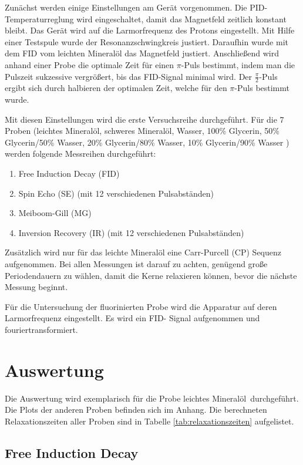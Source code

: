 \documentclass[10pt,twoside]{article}
\renewcommand{\1}{^{-1}}
\renewcommand{\2}{^{-2}}
\newcommand{\3}{^{-3}}
\newcommand{\4}{^{-4}}
\newcommand{\5}{^{-5}}
\newcommand{\6}{^{-6}}
\newcommand{\7}{^{-7}}
\newcommand{\8}{^{-8}}
\newcommand{\9}{^{-9}}
\begin{document}
Zunächst werden einige Einstellungen am Gerät vorgenommen.
Die PID-Temperaturreglung wird eingeschaltet, damit das Magnetfeld zeitlich konstant bleibt. 
Das Gerät wird auf die Larmorfrequenz des Protons eingestellt.
Mit Hilfe einer Testspule wurde der Resonanzschwingkreis justiert.
Daraufhin wurde mit dem FID vom leichten Mineralöl das Magnetfeld justiert.
Anschließend wird anhand einer Probe die optimale Zeit für einen $\pi$-Puls bestimmt, 
indem man die Pulszeit sukzessive vergrößert, bis das FID-Signal minimal wird.
Der $\frac{\pi}{2}$-Puls ergibt sich durch halbieren der optimalen Zeit, welche für den $\pi$-Puls bestimmt wurde.

Mit diesen Einstellungen wird die erste Versuchsreihe durchgeführt.
Für die 7 Proben (leichtes Mineralöl, schweres Mineralöl, Wasser, 100\% Glycerin, 50\% Glycerin/50\% Wasser, 20\% Glycerin/80\% Wasser, 10\% Glycerin/90\% Wasser )
werden folgende Messreihen durchgeführt:
\begin{enumerate}[itemsep=0pt] 
\item Free Induction Decay (FID)
\item Spin Echo (SE) (mit 12 verschiedenen Pulsabständen)
\item Meiboom-Gill (MG) 
\item Inversion Recovery (IR) (mit 12 verschiedenen Pulsabständen)
\end{enumerate}

Zusätzlich wird nur für das leichte Mineralöl eine Carr-Purcell (CP) Sequenz aufgenommen.
Bei allen Messungen ist darauf zu achten, genügend große Periodendauern zu wählen, damit die Kerne relaxieren können, bevor die nächste Messung beginnt.

Für die Untersuchung der fluorinierten Probe wird die Apparatur auf deren Larmorfrequenz eingestellt. 
Es wird ein FID- Signal aufgenommen und fouriertransformiert.

\section{Auswertung}

Die Auswertung wird exemplarisch für die Probe \glqq leichtes Mineralöl\grqq~durchgeführt. Die Plots der anderen Proben befinden sich im Anhang. Die berechneten Relaxationszeiten aller Proben sind in Tabelle \ref{tab:relaxationszeiten} aufgelistet.

\subsection{Free Induction Decay}
\end{document}
